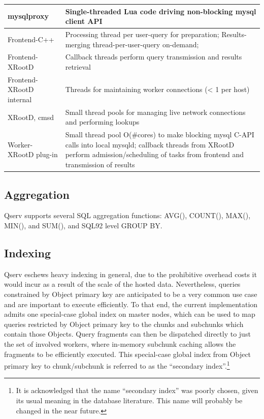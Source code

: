 \documentclass[DM,lsstdraft,toc]{lsstdoc}
\begin{document}
\begin{longtable}{|l|p{}|}
\hline
mysqlproxy & Single-threaded Lua code driving non-blocking mysql client API \\ \hline
Frontend-C++ & Processing thread per user-query for preparation; Results-merging
thread-per-user-query on-demand; \\ \hline
Frontend-XRootD &
Callback threads perform query transmission and results retrieval \\ \hline
Frontend-XRootD internal &
Threads for maintaining worker connections (\textless{} 1 per
host) \\ \hline
XRootD, cmsd &
Small thread pools for managing live network connections and performing
lookups \\ \hline
Worker-XRootD plug-in &
Small thread pool O(\#cores) to make blocking mysql C-API calls into
local mysqld; callback threads from XRootD
perform admission/scheduling of tasks from frontend and transmission of
results \\ \hline
\hline
\end{longtable}

\subsection{Aggregation}\label{aggregation}

Qserv supports several SQL aggregation functions: AVG(), COUNT(), MAX(),
MIN(), and SUM(), and SQL92 level GROUP BY.

\subsection{Indexing}\label{indexing-1}

Qserv eschews heavy indexing in general, due to the prohibitive overhead costs
it would incur as a result of the scale of the hosted data. Nevertheless,
queries constrained by Object primary key are anticipated to be a very common
use case and are important to execute efficiently.  To that end, the current
implementation admits one special-case global index on master nodes, which can
be used to map queries restricted by Object primary key to the chunks and
subchunks which contain those Objects. Query fragments can then be dispatched
directly to just the set of involved workers, where in-memory subchunk caching
allows the fragments to be efficiently executed.  This special-case global
index from Object primary key to chunk/subchunk is referred to as the
``secondary index''.\footnote{It is acknowledged that the name ``secondary
index'' was poorly chosen, given its usual meaning in the database literature.  This
name will probably be changed in the near future.}
\end{document}
